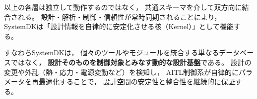 \vspace{0.5em}
\noindent
以上の各層は独立して動作するのではなく，
共通スキーマを介して双方向に結合される。
設計・解析・制御・信頼性が常時同期されることにより，
SystemDKは「設計情報を自律的に安定化させる核（Kernel）」として機能する。

\vspace{0.5em}
\noindent
すなわちSystemDKは，
個々のツールやモジュールを統合する単なるデータベースではなく，
\textbf{設計そのものを制御対象とみなす動的な設計基盤}である。
設計の変更や外乱（熱・応力・電源変動など）を検知し，
AITL制御系が自律的にパラメータを再最適化することで，
設計空間の安定性と整合性を継続的に保証する。
